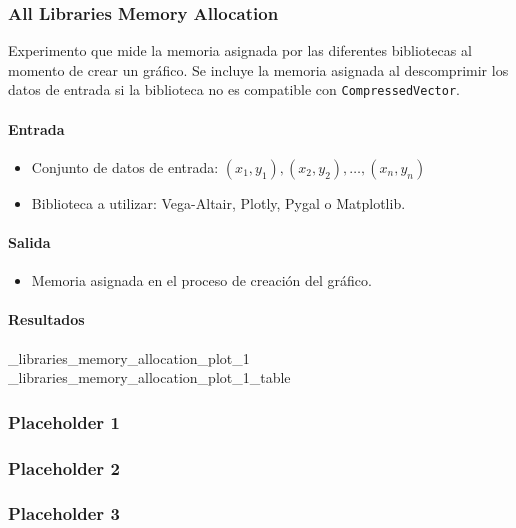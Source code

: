 \subsubsection{All Libraries Memory Allocation}
\label{all_libraries_memory_allocation}

Experimento que mide la memoria asignada por las diferentes bibliotecas al momento de crear un gráfico. Se incluye la memoria asignada al descomprimir los datos de entrada si la biblioteca no es compatible con \texttt{CompressedVector}.

\paragraph{Entrada}
\begin{itemize}
    \item Conjunto de datos de entrada: \( (x_1, y_1), (x_2, y_2), \ldots, (x_n, y_n) \)
    \item Biblioteca a utilizar: Vega-Altair, Plotly, Pygal o Matplotlib.
\end{itemize}

\paragraph{Salida}
\begin{itemize}
    \item Memoria asignada en el proceso de creación del gráfico.
\end{itemize}

\paragraph{Resultados}

\all_libraries_memory_allocation_plot_1
\all_libraries_memory_allocation_plot_1_table

\subsubsection{Placeholder 1}
\label{vega_altair_plot_time}

\subsubsection{Placeholder 2}
\label{pygal_plot_time}

\subsubsection{Placeholder 3}
\label{vega_altair_plot_plus_build_time}

